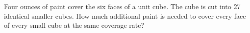 Four ounces of paint cover the six faces of a unit cube. The cube is cut into 27 identical smaller cubes. How much additional paint is needed to cover every face of every small cube at the same coverage rate?
